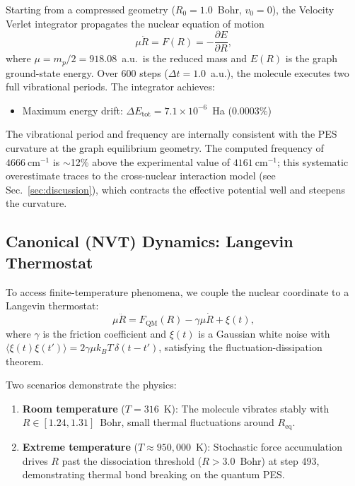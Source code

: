 \documentclass[aps,pra,twocolumn,superscriptaddress,longbibliography,floatfix]{revtex4-2}
\begin{document}
Starting from a compressed geometry ($R_0 = 1.0$~Bohr, $v_0 = 0$),
the Velocity Verlet integrator propagates the nuclear equation of
motion
\begin{equation}
  \mu \ddot{R} = F(R) = -\frac{\partial E}{\partial R},
  \label{eq:newton}
\end{equation}
where $\mu = m_p/2 = 918.08$~a.u.\ is the reduced mass and $E(R)$
is the graph ground-state energy. Over 600 steps ($\Delta t =
1.0$~a.u.), the molecule executes two full vibrational periods.
The integrator achieves:

\begin{itemize}
  \item Maximum energy drift:
    $\Delta E_{\mathrm{tot}} = 7.1 \times 10^{-6}$~Ha (0.0003\%)
\end{itemize}

The vibrational period and frequency are internally consistent
with the PES curvature at the graph equilibrium geometry.
The computed frequency of $4666~\mathrm{cm}^{-1}$ is $\sim$12\%
above the experimental value of $4161~\mathrm{cm}^{-1}$; this
systematic overestimate traces to the cross-nuclear interaction
model (see Sec.~\ref{sec:discussion}), which contracts the effective
potential well and steepens the curvature.

\subsection{Canonical (NVT) Dynamics: Langevin Thermostat}
\label{sec:nvt}

To access finite-temperature phenomena, we couple the nuclear
coordinate to a Langevin thermostat:
\begin{equation}
  \mu \ddot{R} = F_{\mathrm{QM}}(R) - \gamma\mu\dot{R} + \xi(t),
  \label{eq:langevin}
\end{equation}
where $\gamma$ is the friction coefficient and $\xi(t)$ is a
Gaussian white noise with
$\langle\xi(t)\xi(t')\rangle = 2\gamma\mu k_B T\,\delta(t-t')$,
satisfying the fluctuation-dissipation theorem.

Two scenarios demonstrate the physics:

\begin{enumerate}
  \item \textbf{Room temperature} ($T = 316$~K): The molecule
    vibrates stably with $R \in [1.24, 1.31]$~Bohr, small thermal
    fluctuations around $R_{\mathrm{eq}}$.
  \item \textbf{Extreme temperature} ($T \approx 950{,}000$~K):
    Stochastic force accumulation drives $R$ past the dissociation
    threshold ($R > 3.0$~Bohr) at step 493, demonstrating thermal
    bond breaking on the quantum PES.
\end{enumerate}
\end{document}
